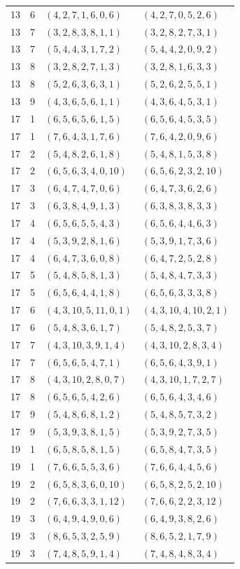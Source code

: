 \begin{longtable}{rrll}
13&6&$(4,2,7,1,6,0,6)$&$(4,2,7,0,5,2,6)$\\
13&7&$(3,2,8,3,8,1,1)$&$(3,2,8,2,7,3,1)$\\
13&7&$(5,4,4,3,1,7,2)$&$(5,4,4,2,0,9,2)$\\
13&8&$(3,2,8,2,7,1,3)$&$(3,2,8,1,6,3,3)$\\
13&8&$(5,2,6,3,6,3,1)$&$(5,2,6,2,5,5,1)$\\
13&9&$(4,3,6,5,6,1,1)$&$(4,3,6,4,5,3,1)$\\
17&1&$(6,5,6,5,6,1,5)$&$(6,5,6,4,5,3,5)$\\
17&1&$(7,6,4,3,1,7,6)$&$(7,6,4,2,0,9,6)$\\
17&2&$(5,4,8,2,6,1,8)$&$(5,4,8,1,5,3,8)$\\
17&2&$(6,5,6,3,4,0,10)$&$(6,5,6,2,3,2,10)$\\
17&3&$(6,4,7,4,7,0,6)$&$(6,4,7,3,6,2,6)$\\
17&3&$(6,3,8,4,9,1,3)$&$(6,3,8,3,8,3,3)$\\
17&4&$(6,5,6,5,5,4,3)$&$(6,5,6,4,4,6,3)$\\
17&4&$(5,3,9,2,8,1,6)$&$(5,3,9,1,7,3,6)$\\
17&4&$(6,4,7,3,6,0,8)$&$(6,4,7,2,5,2,8)$\\
17&5&$(5,4,8,5,8,1,3)$&$(5,4,8,4,7,3,3)$\\
17&5&$(6,5,6,4,4,1,8)$&$(6,5,6,3,3,3,8)$\\
17&6&$(4,3,10,5,11,0,1)$&$(4,3,10,4,10,2,1)$\\
17&6&$(5,4,8,3,6,1,7)$&$(5,4,8,2,5,3,7)$\\
17&7&$(4,3,10,3,9,1,4)$&$(4,3,10,2,8,3,4)$\\
17&7&$(6,5,6,5,4,7,1)$&$(6,5,6,4,3,9,1)$\\
17&8&$(4,3,10,2,8,0,7)$&$(4,3,10,1,7,2,7)$\\
17&8&$(6,5,6,5,4,2,6)$&$(6,5,6,4,3,4,6)$\\
17&9&$(5,4,8,6,8,1,2)$&$(5,4,8,5,7,3,2)$\\
17&9&$(5,3,9,3,8,1,5)$&$(5,3,9,2,7,3,5)$\\
19&1&$(6,5,8,5,8,1,5)$&$(6,5,8,4,7,3,5)$\\
19&1&$(7,6,6,5,5,3,6)$&$(7,6,6,4,4,5,6)$\\
19&2&$(6,5,8,3,6,0,10)$&$(6,5,8,2,5,2,10)$\\
19&2&$(7,6,6,3,3,1,12)$&$(7,6,6,2,2,3,12)$\\
19&3&$(6,4,9,4,9,0,6)$&$(6,4,9,3,8,2,6)$\\
19&3&$(8,6,5,3,2,5,9)$&$(8,6,5,2,1,7,9)$\\
19&3&$(7,4,8,5,9,1,4)$&$(7,4,8,4,8,3,4)$\\

\end{longtable}
